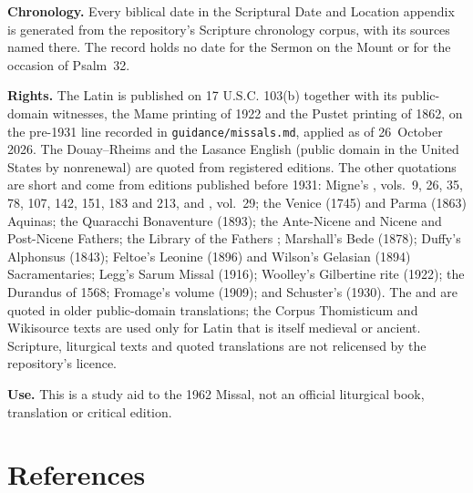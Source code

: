 {\textbf{Chronology.} Every biblical date in the Scriptural Date and Location
appendix is generated from the repository's Scripture chronology corpus, with
its sources named there. The record holds no date for the Sermon on the
Mount or for the occasion of Psalm~32.

\textbf{Rights.} The Latin is published on 17 U.S.C. 103(b) together with its
public-domain witnesses, the Mame printing of 1922 and the Pustet printing of
1862, on the pre-1931 line recorded in \texttt{guidance/missals.md}, applied
as of 26~October 2026. The Douay--Rheims and the Lasance English (public
domain in the United States by nonrenewal) are quoted from registered
editions. The other quotations are short and come from editions published
before 1931: Migne's , vols.~9, 26, 35, 78, 107, 142,
151, 183 and 213, and , vol.~29; the Venice (1745) and
Parma (1863) Aquinas; the Quaracchi Bonaventure (1893); the Ante-Nicene and
Nicene and Post-Nicene Fathers; the Library of the Fathers ;
Marshall's Bede (1878); Duffy's Alphonsus (1843); Feltoe's Leonine (1896) and
Wilson's Gelasian (1894) Sacramentaries; Legg's Sarum Missal (1916); Woolley's
Gilbertine rite (1922); the Durandus of 1568; Fromage's volume (1909); and
Schuster's (1930). The  and  are quoted in older
public-domain translations; the Corpus Thomisticum and Wikisource texts are
used only for Latin that is itself medieval or ancient. Scripture, liturgical texts and quoted
translations are not relicensed by the repository's licence.

\textbf{Use.} This is a study aid to the 1962 Missal, not an official
liturgical book, translation or critical edition.
\par}

\section{References}
\label{sec:references}


